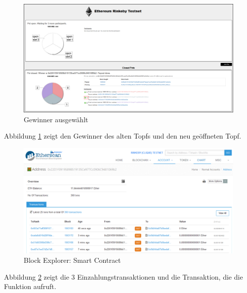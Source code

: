\begin{figure}[H]
\centering
\includegraphics[width=1\linewidth]{Figures/eth_gui/ETH_pot_finished}
\decoRule
\caption{Gewinner ausgewählt}
\label{fig:ETH_pot_finished}
\end{figure}

Abbildung \ref{fig:ETH_pot_finished} zeigt den Gewinner des alten Topfs und den neu geöffneten Topf.

\begin{figure}[H]
\centering
\includegraphics[width=1\linewidth]{Figures/eth_gui/contract_transactions}
\decoRule
\caption{Block Explorer: Smart Contract}
\label{fig:contract_transactions}
\end{figure}

Abbildung \ref{fig:contract_transactions} zeigt die 3 Einzahlungstransaktionen und die Transaktion, die die  Funktion aufruft.

